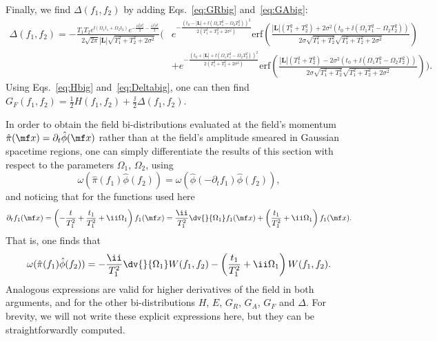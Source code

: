 Finally, we find $\Delta(f_1,f_2)$ by adding Eqs.~\eqref{eq:GRbig} and~\eqref{eq:GAbig}:{\footnotesize
\begin{align}
    \Delta(f_1,f_2) = - \frac{T_1T_2e^{\ii (\Omega_1 t_1+\Omega_2 t_2)}e^{- \frac{\Omega_2^2 T_2^2}{2} - \frac{\Omega_1^2 T_1^2}{2}}}{2\sqrt{2\pi}|\bm L|\sqrt{T_1^2 + T_2^2 + 2\sigma^2}}\Bigg(&e^{- \frac{(t_0 - |\bm L|+\ii (\Omega_1 T_1^2- \Omega_2 T_2^2))^2}{2(T_1^2 + T_2^2 + 2\sigma^2)}} \text{erf}\left(\tfrac{|\bm L|(T_1^2+T_2^2)+2\sigma^2(t_0+\ii (\Omega_1 T_1^2- \Omega_2 T_2^2))}{2\sigma\sqrt{T_1^2 + T_2^2}\sqrt{T_1^2 + T_2^2 + 2\sigma^2}}\right)\nonumber\\
    &+e^{- \frac{(t_0 + |\bm L|+\ii (\Omega_1 T_1^2- \Omega_2 T_2^2))^2}{2(T_1^2 + T_2^2 + 2\sigma^2)}}\text{erf}\left(\tfrac{|\bm L|(T_1^2+T_2^2) - 2\sigma^2(t_0+\ii (\Omega_1 T_1^2- \Omega_2 T_2^2))}{2\sigma\sqrt{T_1^2 + T_2^2}\sqrt{T_1^2 + T_2^2 + 2\sigma^2}}\right)\Bigg).\label{eq:Deltabig}
\end{align}}
Using Eqs.~\eqref{eq:Hbig} and~\eqref{eq:Deltabig}, one can then find $G_F(f_1,f_2) = \frac{1}{2}H(f_1,f_2) + \frac{\ii}{2}\Delta(f_1,f_2)$.


In order to obtain the field bi-distributions evaluated at the field's momentum $\hat{\pi}(\mf x) = \partial_t \hat{\phi}(\mf x)$ rather than at the field's amplitude smeared in Gaussian spacetime regions, one can simply differentiate the results of this section with respect to the parameters $\Omega_1$, $\Omega_2$, using
\begin{equation}
    \omega( \hat{\pi}(f_1)\hat{\phi}(f_2)) = \omega( \hat{\phi}(-\partial_tf_1)\hat{\phi}(f_2)),
\end{equation}
and noticing that for the functions used here
\begin{equation}
    \partial_t f_1(\mf x) = \left(- \frac{t}{T_1^2} + \frac{t_1}{T_1^2} + \ii \Omega_1\right) f_1(\mf x) = \frac{\ii}{T_1^2}\dv{}{\Omega_1}f_1(\mf x) + \left(\frac{t_1}{T_1^2} + \ii \Omega_1\right) f_1(\mf x).
\end{equation}
That is, one finds that
\begin{equation}
    \omega( \hat{\pi}(f_1)\hat{\phi}(f_2)) =  - \frac{\ii}{T_1^2}\dv{}{\Omega_1}W(f_1,f_2) -\left(\frac{t_1}{T_1^2} + \ii \Omega_1\right) W(f_1,f_2).
\end{equation}
Analogous expressions are valid for higher derivatives of the field in both arguments, and for the other bi-distributions $H$, $E$, $G_R$, $G_A$, $G_F$ and $\Delta$. For brevity, we will not write these explicit expressions here, but they can be straightforwardly computed.



